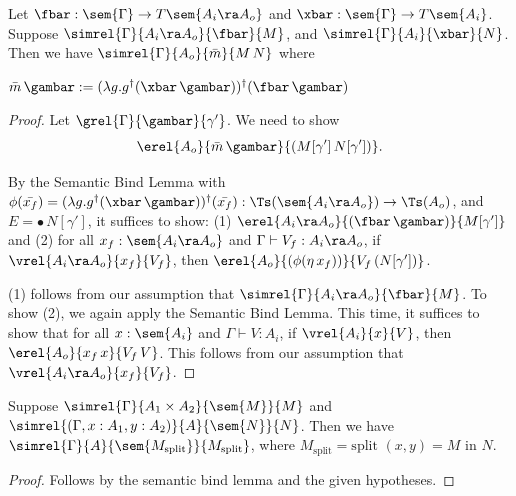 \begin{lemma}
    Let $\fbar : \sem{\Gamma} \to T\sem{A_i \ra A_o}$ and 
    $\xbar : \sem{\Gamma} \to T\sem{A_i}$.
    Suppose $\simrel{\Gamma}{A_i \ra A_o}{\fbar}{M}$, and
    $\simrel{\Gamma}{A_i}{\xbar}{N}$. Then we have
    $\simrel{\Gamma}{A_o}{\bar{m}}{M\, N}$ where

    $\bar{m}\, \gambar := (\lambda g. g^\dag (\xbar\, \gambar))^\dag (\fbar\, \gambar)$
\end{lemma}
\begin{proof}
    Let $\grel{\Gamma}{\gambar}{\gamma'}$. We need to show
    \[ \erel{A_o} {\bar{m}\, \gambar} {(M[\gamma']\, N[\gamma'])}. \]

    By the Semantic Bind Lemma with
    $\phi(\bar{x_f}) = (\lambda g. g^\dag (\xbar\, \gambar))^\dag (\bar{x_f})
    : \Ts(\sem{A_i \ra A_o}) \to \Ts(A_o)$, and 
    $E = \bullet\, N[\gamma']$, it suffices to show:
    (1) $\erel{A_i \ra A_o}{(\fbar\, \gambar)}{M[\gamma']}$ and
    (2) for all $x_f : \sem{A_i \ra A_o}$ and $\Gamma \vdash V_f : A_i \ra A_o$,
    if $\vrel{A_i \ra A_o}{x_f}{V_f}$, then $\erel{A_o} {(\phi(\eta\, x_f))} {V_f\, (N[\gamma'])}$.

    (1) follows from our assumption that $\simrel{\Gamma}{A_i \ra
    A_o}{\fbar}{M}$.
    To show (2), we again apply the Semantic Bind Lemma. This time, it suffices
    to show that for all $x : \sem{A_i}$ and $\Gamma \vdash V : A_i$, if
    $\vrel{A_i}{x}{V}$, then $\erel{A_o}{x_f\, x}{V_f\, V}$. This follows from
    our assumption that $\vrel{A_i \ra A_o}{x_f}{V_f}$.



\end{proof}

\begin{lemma}
Suppose $\simrel{\Gamma}{A_1 \times A_2}{\sem{M}}{M}$ and 
$\simrel{(\Gamma, x : A_1, y : A_2)}{A}{\sem{N}}{N}$. Then we have
$\simrel {\Gamma} {A} {\sem {M_{\text{split}}}} {{M_{\text{split}}}}$,
where ${M_{\text{split}}} = \textrm{split } (x,y) = M \textrm{ in } N$.
\end{lemma}
\begin{proof}
    Follows by the semantic bind lemma and the given hypotheses.
\end{proof}

